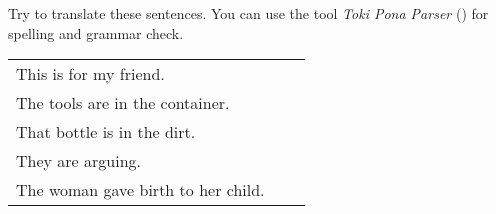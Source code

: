 Try to translate these sentences. 
You can use the tool \textit{Toki Pona Parser} (\cite{www:rowa:02}) for spelling and grammar check. 

\begin{supertabular}{p{5,5cm}|ll}
This is for my friend.  &&  \\ %
The tools are in the container.  && \\ %
That bottle is in the dirt.  &&  \\ %
They are arguing. &&  \\ %
The woman gave birth to her child. &&  \\ %
\end{supertabular} 

%
